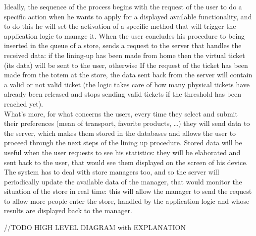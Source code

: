 \documentclass[]{article}
\begin{document}
\begin{paragraph}
					
					Ideally, the sequence of the process begins with the request of the user to do a specific action when he wants to apply for a displayed available functionality, and to do this he will set the activation of a specific method that will trigger the application logic to manage it.
When the user concludes his procedure to being inserted in the queue of a store, sends a request to the server that handles the received data: if the lining-up has been made from home then the virtual ticket (its data) will be sent to the user, otherwise If the request of the ticket has been made from the totem at the store, the data sent back from the server will contain a valid or not valid ticket (the logic takes care of how many physical tickets have already been released and stops  sending valid tickets if the threshold has been reached yet).\\
					\newline
What’s more, for what concerns the users, every time they select and submit their preferences (mean of transport, favorite products, …) they will send data to the server, which makes them stored in the databases and allows the user to proceed through the next steps of the lining up procedure. Stored data will be useful when the user requests to see his statistics: they will be elaborated and sent back to the user, that would see them displayed on the screen of his device.\\
					\newline
The system has to deal with store managers too, and so the server will periodically update the available data of the manager, that would monitor the situation of the store in real time: this will allow the manager to send the request to allow more people enter the store, handled by the application logic and whose results are displayed back to the manager. \newline

\large //TODO HIGH LEVEL DIAGRAM with EXPLANATION
\newpage
				
				\end {paragraph}
				
\end{document}
